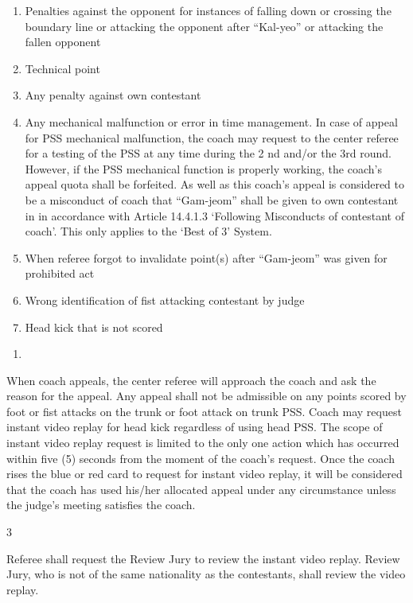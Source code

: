 \documentclass[
]{report}
\providecommand{\tightlist}{%
  \setlength{\itemsep}{0pt}\setlength{\parskip}{0pt}}
\renewcommand{\labelenumi}{\arabic{enumi}}
\begin{document}
\begin{enumerate}
\def\labelenumi{\roman{enumi})}
\tightlist
\item
  Penalties against the opponent for instances of falling down or
  crossing the boundary line or attacking the opponent after ``Kal-yeo''
  or attacking the fallen opponent
\item
  Technical point
\item
  Any penalty against own contestant
\item
  Any mechanical malfunction or error in time management. In case of
  appeal for PSS mechanical malfunction, the coach may request to the
  center referee for a testing of the PSS at any time during the 2 nd
  and/or the 3rd round. However, if the PSS mechanical function is
  properly working, the coach's appeal quota shall be forfeited. As well
  as this coach's appeal is considered to be a misconduct of coach that
  ``Gam-jeom'' shall be given to own contestant in in accordance with
  Article 14.4.1.3 `Following Misconducts of contestant of coach'. This
  only applies to the `Best of 3' System.
\item
  When referee forgot to invalidate point(s) after ``Gam-jeom'' was
  given for prohibited act
\item
  Wrong identification of fist attacking contestant by judge
\item
  Head kick that is not scored
\end{enumerate}

\begin{enumerate}
\def\labelenumi{\arabic{enumi}.}
\setcounter{enumi}{1}
\tightlist
\item
\end{enumerate}

When coach appeals, the center referee will approach the coach and ask
the reason for the appeal. Any appeal shall not be admissible on any
points scored by foot or fist attacks on the trunk or foot attack on
trunk PSS. Coach may request instant video replay for head kick
regardless of using head PSS. The scope of instant video replay request
is limited to the only one action which has occurred within five (5)
seconds from the moment of the coach's request. Once the coach rises the
blue or red card to request for instant video replay, it will be
considered that the coach has used his/her allocated appeal under any
circumstance unless the judge's meeting satisfies the coach.

3

Referee shall request the Review Jury to review the instant video
replay. Review Jury, who is not of the same nationality as the
contestants, shall review the video replay.
\end{document}
